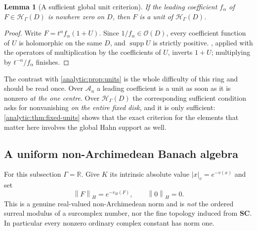 \documentclass[11pt,letterpaper]{article}
\newtheorem{lemma}[theorem]{Lemma}
\theoremstyle{definition}
\theoremstyle{remark}
\newcommand{\R}{\mathbb R}
\newcommand{\SC}{\mathbf{SC}}
\newcommand{\A}{\mathscr A}
\newcommand{\HH}{\mathcal H}
\newcommand{\OO}{\mathcal O}
\newcommand{\supp}{\operatorname{supp}}
\newcommand{\norm}[1]{\left\lVert#1\right\rVert}
\newcommand{\vH}{v_{\!H}}
\numberwithin{equation}{section}
\begin{document}
\begin{lemma}[A sufficient global unit criterion]
\label{analytic:lem:fixed-global-unit}
If the leading coefficient $f_\alpha$ of $F\in\HH_\Gamma(D)$ is
\emph{nowhere} zero on $D$, then $F$ is a unit of $\HH_\Gamma(D)$.
\end{lemma}
\begin{proof}
Write $F=t^\alpha f_\alpha(1+U)$. Since $1/f_\alpha\in\OO(D)$, every
coefficient function of $U$ is holomorphic on the same $D$, and $\supp U$
is strictly positive. , applied with the
operators of multiplication by the coefficients of $U$, inverts $1+U$;
multiplying by $t^{-\alpha}/f_\alpha$ finishes.
\end{proof}

The contrast with \cref{analytic:prop:units} is the whole difficulty of
this ring and should be read once. Over $\A_n$ a leading coefficient is a
unit as soon as it is nonzero \emph{at the one centre}. Over
$\HH_\Gamma(D)$ the corresponding sufficient condition asks for
nonvanishing \emph{on the entire fixed disk}, and it is only sufficient:
\cref{analytic:thm:fixed-units} shows that the exact criterion for the
elements that matter here involves the global Hahn support as well.

\subsection{A uniform non-Archimedean Banach algebra}
\label{analytic:subsec:fixed-banach}
For this subsection $\Gamma=\R$. Give $K$ its intrinsic absolute value
$|x|_v=e^{-v(x)}$ and set
\begin{equation}\label{analytic:eq:fixed-norm}
 \norm{F}_H=e^{-\vH(F)},\qquad \norm{0}_H=0 .
\end{equation}
This is a genuine real-valued non-Archimedean norm and is \emph{not} the
ordered surreal modulus of a surcomplex number, nor the fine topology
induced from $\SC$. In particular every nonzero ordinary complex constant
has norm one.
\end{document}
